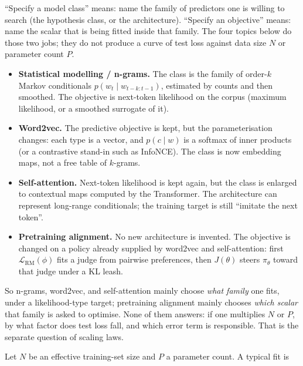\documentclass[11pt,a4paper]{article}
\theoremstyle{definition}
\begin{document}
\begin{note}\label{note:spr2025-nlp-class-objective}
``Specify a model class'' means: name the family of predictors one is willing to search (the hypothesis class, or the architecture). ``Specify an objective'' means: name the scalar that is being fitted inside that family. The four topics below do those two jobs; they do not produce a curve of test loss against data size \(N\) or parameter count \(P\).

\begin{itemize}
  \item \textbf{Statistical modelling / n-grams.} The class is the family of order-\(k\) Markov conditionals \(p(w_t\mid w_{t-k:t-1})\), estimated by counts and then smoothed. The objective is next-token likelihood on the corpus (maximum likelihood, or a smoothed surrogate of it).
  \item \textbf{Word2vec.} The predictive objective is kept, but the parameterisation changes: each type is a vector, and \(p(c\mid w)\) is a softmax of inner products (or a contrastive stand-in such as InfoNCE). The class is now embedding maps, not a free table of \(k\)-grams.
  \item \textbf{Self-attention.} Next-token likelihood is kept again, but the class is enlarged to contextual maps computed by the Transformer. The architecture can represent long-range conditionals; the training target is still ``imitate the next token''.
  \item \textbf{Pretraining alignment.} No new architecture is invented. The objective is changed on a policy already supplied by word2vec and self-attention: first \(\mathcal{L}_{\mathrm{RM}}(\phi)\) fits a judge from pairwise preferences, then \(J(\theta)\) steers \(\pi_\theta\) toward that judge under a KL leash.
\end{itemize}

So n-grams, word2vec, and self-attention mainly choose \emph{what family} one fits, under a likelihood-type target; pretraining alignment mainly chooses \emph{which scalar} that family is asked to optimise. None of them answers: if one multiplies \(N\) or \(P\), by what factor does test loss fall, and which error term is responsible. That is the separate question of scaling laws.
\end{note}

Let \(N\) be an effective training-set size and \(P\) a parameter count. A typical fit is
\end{document}
